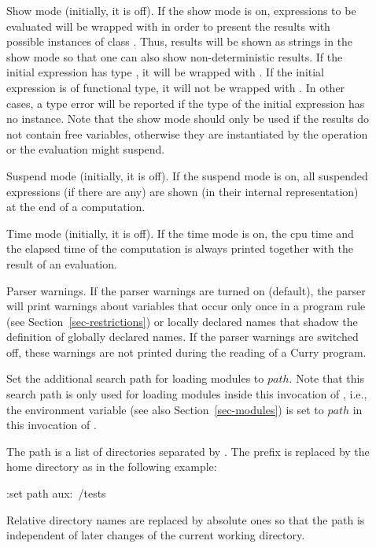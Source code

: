 \begin{description}
\item[]
Show mode (initially, it is off).
If the show mode is on, expressions to be evaluated will be wrapped
with  in order to present the results with
possible instances of class .
Thus, results will be shown as strings in the show mode
so that one can also show non-deterministic results.
If the initial expression has type , it will be wrapped
with .
If the initial expression is of functional type,
it will not be wrapped with .
In other cases, a type error will be reported if the type
of the initial expression has no  instance.
Note that the show mode should only be used if the results
do not contain free variables, otherwise they are instantiated
by the  operation or the evaluation might suspend.

\item[]%
Suspend mode (initially, it is off).
If the suspend mode is on, all suspended expressions
(if there are any) are shown (in their internal representation) at the end
of a computation.

\item[]
Time mode (initially, it is off).
If the time mode is on, the cpu time and the elapsed time
of the computation is always printed together with the result
of an evaluation.

\item[] Parser warnings. If the parser
warnings are turned on (default), the parser will print
warnings about variables that occur only once in a program rule
(see Section~\ref{sec-restrictions})
or locally declared names that shadow the definition of
globally declared names. If the parser warnings are switched off,
these warnings are not printed during the reading of a Curry program.

\item[] Set the additional search path
for loading modules to $path$.
Note that this search path is only used for loading modules
inside this invocation of \CYS, i.e., the environment variable
 (see also Section~\ref{sec-modules})
is set to $path$ in this invocation of \CYS.

The path is a list of directories separated by \ccode{:}.
The prefix  is replaced by the home directory as
in the following example:
\begin{curry}
:set path aux:~/tests
\end{curry}
Relative directory names are replaced by absolute ones
so that the path is independent of later changes of the
current working directory.


\end{description}
